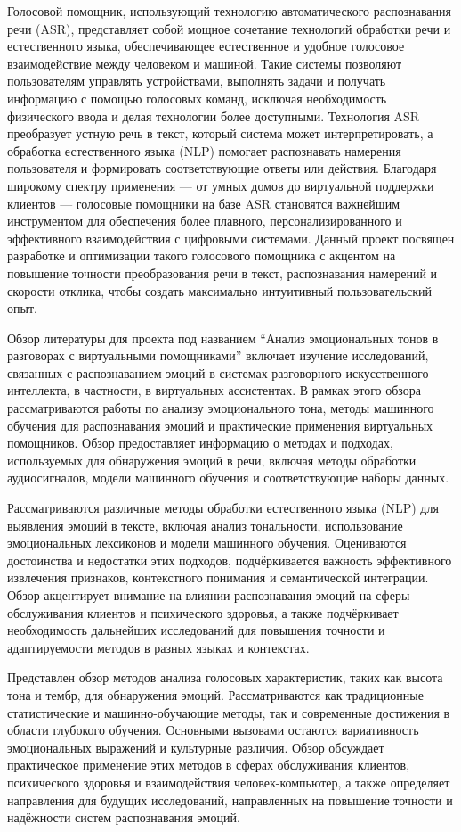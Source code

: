 Голосовой помощник, использующий технологию автоматического распознавания речи (ASR), представляет собой мощное сочетание технологий обработки речи и естественного языка, обеспечивающее естественное и удобное голосовое взаимодействие между человеком и машиной. Такие системы позволяют пользователям управлять устройствами, выполнять задачи и получать информацию с помощью голосовых команд, исключая необходимость физического ввода и делая технологии более доступными. Технология ASR преобразует устную речь в текст, который система может интерпретировать, а обработка естественного языка (NLP) помогает распознавать намерения пользователя и формировать соответствующие ответы или действия. Благодаря широкому спектру применения — от умных домов до виртуальной поддержки клиентов — голосовые помощники на базе ASR становятся важнейшим инструментом для обеспечения более плавного, персонализированного и эффективного взаимодействия с цифровыми системами. Данный проект посвящен разработке и оптимизации такого голосового помощника с акцентом на повышение точности преобразования речи в текст, распознавания намерений и скорости отклика, чтобы создать максимально интуитивный пользовательский опыт.


Обзор литературы для проекта под названием ``Анализ эмоциональных тонов в разговорах с виртуальными помощниками'' включает изучение исследований, связанных с распознаванием эмоций в системах разговорного искусственного интеллекта, в частности, в виртуальных ассистентах. В рамках этого обзора рассматриваются работы по анализу эмоционального тона, методы машинного обучения для распознавания эмоций и практические применения виртуальных помощников. Обзор предоставляет информацию о методах и подходах, используемых для обнаружения эмоций в речи, включая методы обработки аудиосигналов, модели машинного обучения и соответствующие наборы данных.


 Рассматриваются различные методы обработки естественного языка (NLP) для выявления эмоций в тексте, включая анализ тональности, использование эмоциональных лексиконов и модели машинного обучения. Оцениваются достоинства и недостатки этих подходов, подчёркивается важность эффективного извлечения признаков, контекстного понимания и семантической интеграции. Обзор акцентирует внимание на влиянии распознавания эмоций на сферы обслуживания клиентов и психического здоровья, а также подчёркивает необходимость дальнейших исследований для повышения точности и адаптируемости методов в разных языках и контекстах.
	
 Представлен обзор методов анализа голосовых характеристик, таких как высота тона и тембр, для обнаружения эмоций. Рассматриваются как традиционные статистические и машинно-обучающие методы, так и современные достижения в области глубокого обучения. Основными вызовами остаются вариативность эмоциональных выражений и культурные различия. Обзор обсуждает практическое применение этих методов в сферах обслуживания клиентов, психического здоровья и взаимодействия человек-компьютер, а также определяет направления для будущих исследований, направленных на повышение точности и надёжности систем распознавания эмоций.
	
